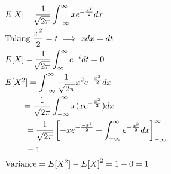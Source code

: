 \documentclass[journal,12pt,twocolumn]{IEEEtran}
\renewcommand\thesection{\arabic{section}}
\begin{document}
\begin{enumerate}[label=\thesection.\arabic*
,ref=\thesection.\theenumi]
\begin{align}
        &E[X] = \frac{1}{\sqrt[]{2\pi}}\int_{-\infty}^{\infty}xe^{-\frac{x^2}{2}}dx\\
        &\text{Taking  }\frac{x^2}{2} = t \implies x dx = dt\\
        &E[X] = \frac{1}{\sqrt[]{2\pi}}\int_{\infty}^{\infty}e^{-t}dt = 0\\
        &E[X^2]=\int_{-\infty}^{\infty} \frac{1}{\sqrt{2\pi}} x^2e^{-\frac{x^2}{2}} dx\\
        &~~~~~~=\frac{1}{\sqrt{2\pi}}\int_{-\infty}^{\infty}  x(xe^{-\frac{x^2}{2}}) dx\\
        &~~~~~~~= \frac{1}{\sqrt{2\pi}} {}\left[-xe^{-\frac{-x^2}{2}}+\int_{-\infty}^{\infty} e^{-\frac{x^2}{2}} dx\right]^{\infty}_{-\infty}\\
        &~~~~~~~= 1\\
        &\text{Variance} = E[X^2] - {E[X]}^2 = 1 - 0 = 1
    \end{align}
    \end{enumerate}
\end{document}
